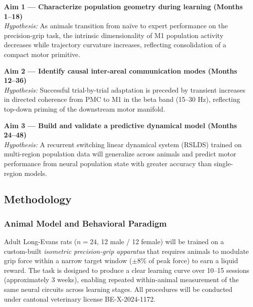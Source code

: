 \begin{tcolorbox}[snsfbox, title={\faBullseye\quad Specific Aims Overview}]

\textbf{Aim 1 --- Characterize population geometry during learning (Months 1--18)}\\
\textit{Hypothesis:} As animals transition from na\"{i}ve to expert performance on the
precision-grip task, the intrinsic dimensionality of M1 population activity decreases while
trajectory curvature increases, reflecting consolidation of a compact motor primitive.

\vspace{6pt}
\textbf{Aim 2 --- Identify causal inter-areal communication modes (Months 12--36)}\\
\textit{Hypothesis:} Successful trial-by-trial adaptation is preceded by transient increases
in directed coherence from PMC to M1 in the beta band (15--30 Hz), reflecting top-down priming
of the downstream motor manifold.

\vspace{6pt}
\textbf{Aim 3 --- Build and validate a predictive dynamical model (Months 24--48)}\\
\textit{Hypothesis:} A recurrent switching linear dynamical system (RSLDS) trained on
multi-region population data will generalize across animals and predict motor performance from
neural population state with greater accuracy than single-region models.

\end{tcolorbox}

\subsection{Methodology}

\subsubsection{Animal Model and Behavioral Paradigm}

Adult Long-Evans rats ($n = 24$, 12 male / 12 female) will be trained on a custom-built
\textit{isometric precision-grip apparatus} that requires animals to modulate grip force within
a narrow target window ($\pm 8\%$ of peak force) to earn a liquid reward. The task is designed
to produce a clear learning curve over 10--15 sessions (approximately 3 weeks), enabling repeated
within-animal measurement of the same neural circuits across learning stages. All procedures will
be conducted under cantonal veterinary license BE-X-2024-1172.

